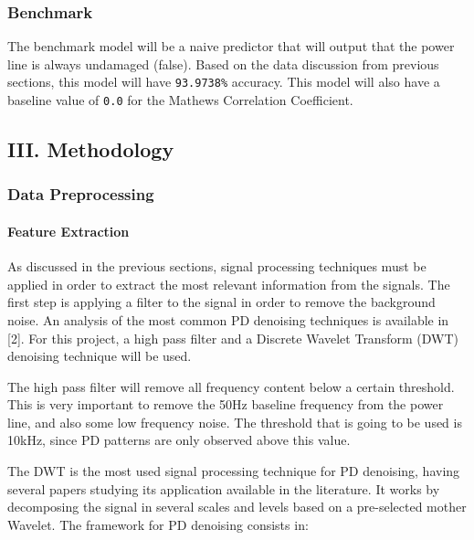 \documentclass[11pt]{article}
\begin{document}
\hypertarget{benchmark}{%
\subsubsection{Benchmark}\label{benchmark}}

The benchmark model will be a naive predictor that will output that the
power line is always undamaged (false). Based on the data discussion
from previous sections, this model will have \texttt{93.9738\%}
accuracy. This model will also have a baseline value of \texttt{0.0} for
the Mathews Correlation Coefficient.

    \hypertarget{iii.-methodology}{%
\subsection{III. Methodology}\label{iii.-methodology}}

\hypertarget{data-preprocessing}{%
\subsubsection{Data Preprocessing}\label{data-preprocessing}}

\hypertarget{feature-extraction}{%
\paragraph{Feature Extraction}\label{feature-extraction}}

As discussed in the previous sections, signal processing techniques must
be applied in order to extract the most relevant information from the
signals. The first step is applying a filter to the signal in order to
remove the background noise. An analysis of the most common PD denoising
techniques is available in {[}2{]}. For this project, a high pass filter
and a Discrete Wavelet Transform (DWT) denoising technique will be used.

The high pass filter will remove all frequency content below a certain
threshold. This is very important to remove the 50Hz baseline frequency
from the power line, and also some low frequency noise. The threshold
that is going to be used is 10kHz, since PD patterns are only observed
above this value.

The DWT is the most used signal processing technique for PD denoising,
having several papers studying its application available in the
literature. It works by decomposing the signal in several scales and
levels based on a pre-selected mother Wavelet. The framework for PD
denoising consists in:
\end{document}
